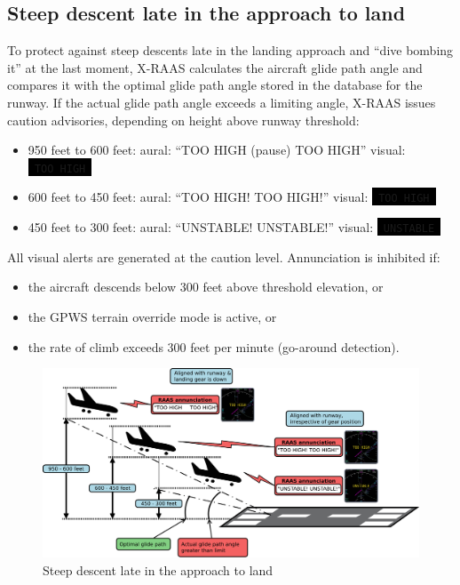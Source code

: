 \documentclass[a4paper,12pt]{article}
\newcommand{\visualadvisory}[3][b]{%
    \ifthenelse{\equal{#1}{b}}{\begin{center}}{}
    \noindent
    \colorbox{black}{\textcolor{#2visualadvisorycolor}{\large\texttt{~#3~}}}
    \ifthenelse{\equal{#1}{b}}{\end{center}}{}}
\begin{document}
\subsection{Steep descent late in the approach to land}
\label{subsec:TooHighMon}

To protect against steep descents late in the landing approach and ``dive
bombing it'' at the last moment, X-RAAS calculates the aircraft glide
path angle and compares it with the optimal glide path angle stored in
the database for the runway. If the actual glide path angle exceeds a
limiting angle, X-RAAS issues caution advisories, depending on height
above runway threshold:

\begin{itemize}

\item 950 feet to 600 feet: aural: ``TOO HIGH (pause) TOO HIGH''
visual:\visualadvisory[i]{nonroutine}{TOO HIGH}

\item 600 feet to 450 feet: aural: ``TOO HIGH! TOO HIGH!''
visual:\visualadvisory[i]{nonroutine}{TOO HIGH}

\item 450 feet to 300 feet: aural: ``UNSTABLE! UNSTABLE!''
visual:\visualadvisory[i]{nonroutine}{UNSTABLE}

\end{itemize}

\noindent All visual alerts are generated at the caution level.
Annunciation is inhibited if:

\begin{itemize}

\item the aircraft descends below 300 feet above threshold elevation, or

\item the GPWS terrain override mode is active, or

\item the rate of climb exceeds 300 feet per minute (go-around
detection).

\end{itemize}

\begin{figure}[H]
\begin{center}
\includegraphics[width=\textwidth]{../src/apch_too_hig.pdf}
\end{center}
\caption{Steep descent late in the approach to land}
\end{figure}
\end{document}
